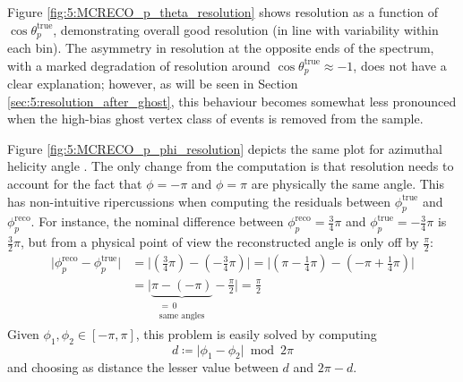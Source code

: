 Figure \ref{fig:5:MCRECO_p_theta_resolution} shows \cthetap resolution as a function of $\cos\theta_p^\text{true}$, demonstrating overall good resolution (in line with \cthetap variability within each bin).
The asymmetry in resolution at the opposite ends of the \cthetap spectrum, with a marked degradation of resolution around $\cos\theta_p^\text{true} \approx -1$, does not have a clear explanation;
however, as will be seen in Section \ref{sec:5:resolution_after_ghost}, this behaviour becomes somewhat less pronounced when the high-bias ghost vertex class of events is removed from the sample.

Figure \ref{fig:5:MCRECO_p_phi_resolution} depicts the same plot for azimuthal helicity angle \phip.
The only change from the \cthetap computation is that \phip resolution needs to account for the fact that $\phi=-\pi$ and $\phi=\pi$ are physically the same angle.
This has non-intuitive ripercussions when computing the residuals between $\phi_p^\text{true}$ and $\phi_p^\text{reco}$.
For instance, the nominal difference between $\phi_p^\text{reco}=\frac{3}{4}\pi$ and $\phi_p^\text{true}=-\frac{3}{4}\pi$ is $\frac{3}{2}\pi$, but from a physical point of view the reconstructed angle is only off by $\frac{\pi}{2}$:
\begin{equation}
\begin{aligned}
\lvert
\phi_p^\text{reco} - \phi_p^\text{true}
\rvert
&=
\bigg|
\left( \frac{3}{4}\pi \right)
-
\left(- \frac{3}{4}\pi \right)
\bigg|
=
\bigg|
\left(\pi - \frac{1}{4}\pi \right)
-
\left(-\pi + \frac{1}{4}\pi \right)
\bigg| \\
&=
\bigg|
\underbrace{\pi - \left( -\pi \right)}_{\substack{=\,0 \\ \text{same angles}}}
- \frac{\pi}{2}
\bigg|
= \frac{\pi}{2}
\end{aligned}
\end{equation}
Given $\phi_1, \phi_2 \in [-\pi, \pi]$, this problem is easily solved by computing 
\begin{equation}
d \coloneqq \lvert \phi_1 - \phi_2 \rvert \bmod 2\pi
\end{equation}
and choosing as distance the lesser value between $d$ and $2\pi-d$.



